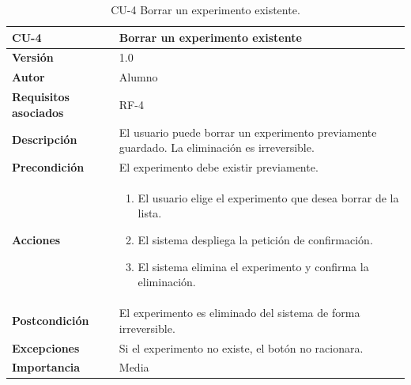 \begin{table}[p]
	\centering
	\begin{tabularx}{\linewidth}{ p{} p{} }
		\toprule
		\textbf{CU-4}    & \textbf{Borrar un experimento existente} \\
		\toprule
		\textbf{Versión}              & 1.0    \\
		\textbf{Autor}                & Alumno \\
		\textbf{Requisitos asociados} & RF-4 \\
		\textbf{Descripción}          & El usuario puede borrar un experimento previamente guardado. La eliminación es irreversible. \\
		\textbf{Precondición}         & El experimento debe existir previamente. \\
		\textbf{Acciones}             &
		\begin{enumerate}
			\item El usuario elige el experimento que desea borrar de la lista.
			\item El sistema despliega la petición de confirmación.
			\item El sistema elimina el experimento y confirma la eliminación.
		\end{enumerate} \\
		\textbf{Postcondición}        & El experimento es eliminado del sistema de forma irreversible. \\
		\textbf{Excepciones}          & Si el experimento no existe, el botón no racionara. \\
		\textbf{Importancia}          & Media \\
		\bottomrule
	\end{tabularx}
	\caption{CU-4 Borrar un experimento existente.}
\end{table}

\FloatBarrier
